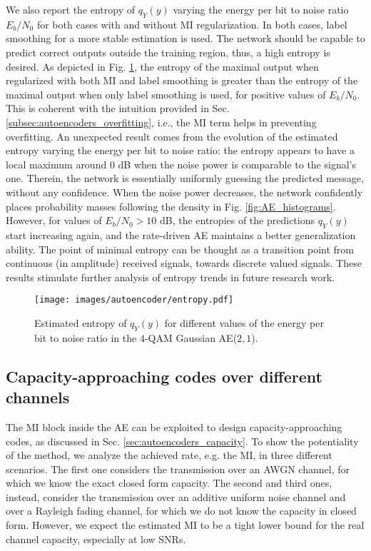 We also report the entropy of $q_Y(y)$ varying the energy per bit to noise ratio $E_b/N_0$ for both cases with and without MI regularization. In both cases, label smoothing for a more stable estimation is used. The network should be capable to predict correct outputs outside the training region, thus, a high entropy is desired. As depicted in Fig. \ref{fig:AE_entropy}, the entropy of the maximal output when regularized with both MI and label smoothing is greater than the entropy of the maximal output when only label smoothing is used, for positive values of $E_b/N_0$. This is coherent with the intuition provided in Sec.\ref{subsec:autoencoders_overfitting}, i.e., the MI term helps in preventing overfitting. An unexpected result comes from the evolution of the estimated entropy varying the energy per bit to noise ratio: the entropy appears to have a local maximum around $0$ dB when the noise power is comparable to the signal's one. Therein, the network is essentially uniformly guessing the predicted message, without any confidence. When the noise power decreases, the network confidently places probability masses following the density in Fig. \ref{fig:AE_histograms}. However, for values of $E_b/N_0 >10$ dB, the entropies of the predictions $q_Y(y)$ start increasing again, and the rate-driven AE maintains a better generalization ability. The point of minimal entropy can be thought as a transition point from continuous (in amplitude) received signals, towards discrete valued signals. These results stimulate further analysis of entropy trends in future research work.  
\begin{figure}
	\centering
	\texttt{[image: images/autoencoder/entropy.pdf]}
	\caption{Estimated entropy of $q_Y(y)$ for different values of the energy per bit to noise ratio in the $4$-QAM Gaussian AE($2,1$).}
	\label{fig:AE_entropy}
\end{figure}

\subsection{Capacity-approaching codes over different channels}
The MI block inside the AE can be exploited to design capacity-approaching codes, as discussed in Sec. \ref{sec:autoencoders_capacity}. To show the potentiality of the method, we analyze the achieved rate, e.g. the MI, in three different scenarios. The first one considers the transmission over an AWGN channel, for which we know the exact closed form capacity. The second and third ones, instead, consider the transmission over an additive uniform noise channel and over a Rayleigh fading channel, for which we do not know the capacity in closed form. However, we expect the estimated MI to be a tight lower bound for the real channel capacity, especially at low SNRs.

